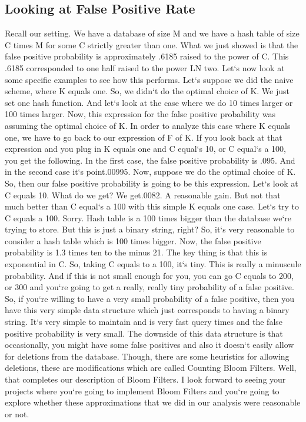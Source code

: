 \subsection{Looking at False Positive Rate}
Recall our setting.
We have a database of size M and we have a hash table of size C times M for some C strictly greater than one.
What we just showed is that the false positive probability is approximately .6185 raised to the power of C\@.
This .6185 corresponded to one half raised to the power LN two.
Let`s now look at some specific examples to see how this performs.
Let`s suppose we did the naive scheme, where K equals one.
So, we didn`t do the optimal choice of K\@.
We just set one hash function.
And let`s look at the case where we do 10 times larger or 100 times larger.
Now, this expression for the false positive probability was assuming the optimal choice of K\@.
In order to analyze this case where K equals one, we have to go back to our expression of F of K\@.
If you look back at that expression and you plug in K equals one and C equal`s 10, or C equal`s a 100, you get the following.
In the first case, the false positive probability is .095.
And in the second case it`s point.00995.
Now, suppose we do the optimal choice of K\@.
So, then our false positive probability is going to be this expression.
Let`s look at C equals 10.
What do we get? We get.0082.
A reasonable gain.
But not that much better than C equal`s a 100 with this simple K equals one case.
Let`s try to C equals a 100.
Sorry.
Hash table is a 100 times bigger than the database we`re trying to store.
But this is just a binary string, right? So, it`s very reasonable to consider a hash table which is 100 times bigger.
Now, the false positive probability is 1.3 times ten to the minus 21.
The key thing is that this is exponential in C\@.
So, taking C equals to a 100, it`s tiny.
This is really a minuscule probability.
And if this is not small enough for you, you can go C equals to 200, or 300 and you`re going to get a really, really tiny probability of a false positive.
So, if you`re willing to have a very small probability of a false positive, then you have this very simple data structure which just corresponds to having a binary string.
It`s very simple to maintain and is very fast query times and the false positive probability is very small.
The downside of this data structure is that occasionally, you might have some false positives and also it doesn`t easily allow for deletions from the database.
Though, there are some heuristics for allowing deletions, these are modifications which are called Counting Bloom Filters.
Well, that completes our description of Bloom Filters.
I look forward to seeing your projects where you`re going to implement Bloom Filters and you`re going to explore whether these approximations that we did in our analysis were reasonable or not.

